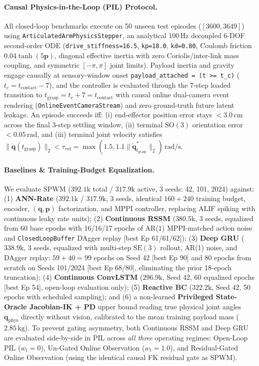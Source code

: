 \documentclass[11pt]{article}
\begin{document}
\paragraph{Causal Physics-in-the-Loop (PIL) Protocol.} All closed-loop benchmarks execute on 50 unseen test episodes ($[3600, 3649]$) using \texttt{ArticulatedArmPhysicsStepper}, an analytical $100\,\text{Hz}$ decoupled 6-DOF second-order ODE (\texttt{drive\_stiffness=16.5}, \texttt{kp=18.0}, \texttt{kd=0.80}, Coulomb friction $0.04\tanh(5\mathbf{p})$, diagonal effective inertia with zero Coriolis/inter-link mass coupling, and symmetric $[-\pi, \pi]$ joint limits). Payload inertia and gravity engage causally at sensory-window onset \texttt{payload\_attached = (t >= t\_c)} ($t_c = t_{\text{contact}} - 7$), and the controller is evaluated through the 7-step loaded transition to $t_{\text{grasp}} = t_c + 7 = t_{\text{contact}}$ with causal online dual-camera event rendering (\texttt{OnlineEventCameraStream}) and zero ground-truth future latent leakage. An episode succeeds iff: (i) end-effector position error stays $< 3.0\,\text{cm}$ across the final 3-step settling window, (ii) terminal $\text{SO}(3)$ orientation error $< 0.05\,\text{rad}$, and (iii) terminal joint velocity satisfies $\|\dot{\mathbf{q}}(t_{\text{grasp}})\|_2 < \tau_{\text{vel}} = \max(1.5, 1.1\|\dot{\mathbf{q}}^*_{t_{\text{grasp}}}\|_2)\,\text{rad/s}$.

\paragraph{Baselines \& Training-Budget Equalization.} We evaluate SPWM ($392.1\text{k}$ total / $317.9\text{k}$ active, 3 seeds: 42, 101, 2024) against: (1) \textbf{ANN-Rate} ($392.1\text{k}$ / $317.9\text{k}$, 3 seeds, identical $160+240$ training budget, encoder, $(\mathbf{q}, \mathbf{p})$ factorization, and MPPI controller, replacing ALIF spiking with continuous leaky rate units); (2) \textbf{Continuous RSSM} ($380.5\text{k}$, 3 seeds, equalized from 60 base epochs with 16/16/17 epochs of AR(1) MPPI-matched action noise and \texttt{ClosedLoopBuffer} DAgger replay [best Ep 61/61/62]); (3) \textbf{Deep GRU} ($338.9\text{k}$, 3 seeds, equalized with multi-step $\text{SE}(3)$ rollout, AR(1) noise, and DAgger replay: $59+40=99$ epochs on Seed 42 [best Ep 90] and 80 epochs from scratch on Seeds 101/2024 [best Ep 68/80], eliminating the prior 18-epoch truncation); (4) \textbf{Continuous ConvLSTM} ($296.9\text{k}$, Seed 42, 60 equalized epochs [best Ep 54], open-loop evaluation only); (5) \textbf{Reactive BC} ($322.2\text{k}$, Seed 42, 50 epochs with scheduled sampling); and (6) a non-learned \textbf{Privileged State-Oracle Jacobian-IK + PD} upper bound reading true physical joint angles $\mathbf{q}_{\text{phys}}$ directly without vision, calibrated to the mean training payload mass ($2.85\,\text{kg}$). To prevent gating asymmetry, both Continuous RSSM and Deep GRU are evaluated side-by-side in PIL across \emph{all three} operating regimes: Open-Loop PIL ($w_t=0$), Un-Gated Online Observation ($w_t=1.0$), and Residual-Gated Online Observation (using the identical causal FK residual gate as SPWM).
\end{document}
